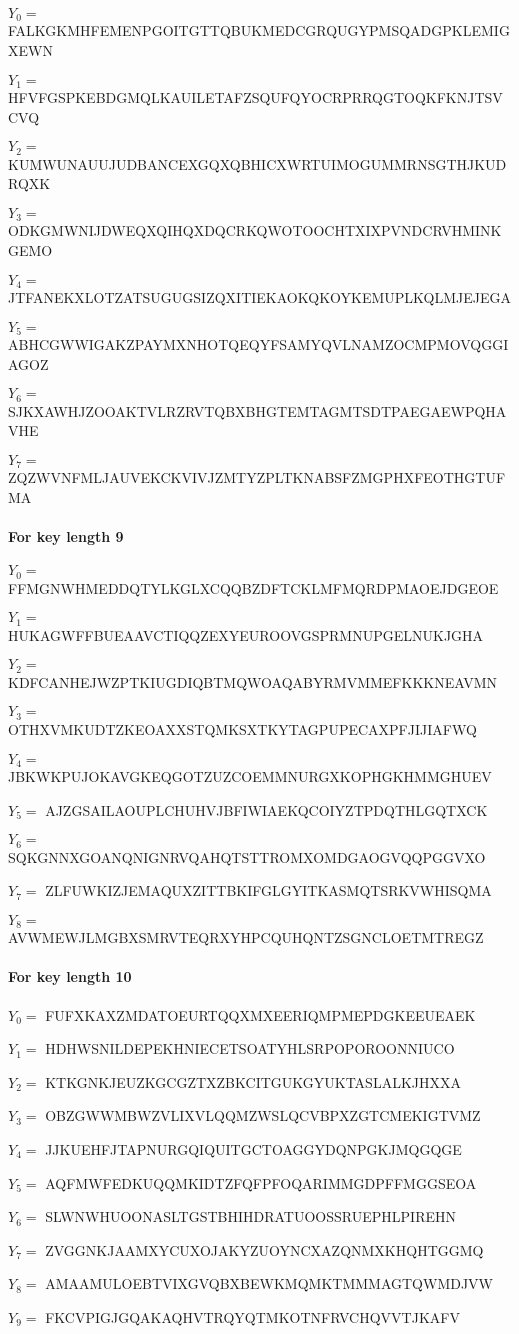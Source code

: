 \documentclass{article}
\begin{document}
$Y_0 = $ FALKGKMHFEMENPGOITGTTQBUKMEDCGRQUGYPMSQADGPKLEMIGXEWN

$Y_1 = $ HFVFGSPKEBDGMQLKAUILETAFZSQUFQYOCRPRRQGTOQKFKNJTSVCVQ

$Y_2 = $ KUMWUNAUUJUDBANCEXGQXQBHICXWRTUIMOGUMMRNSGTHJKUDRQXK

$Y_3 = $ ODKGMWNIJDWEQXQIHQXDQCRKQWOTOOCHTXIXPVNDCRVHMINKGEMO

$Y_4 = $ JTFANEKXLOTZATSUGUGSIZQXITIEKAOKQKOYKEMUPLKQLMJEJEGA

$Y_5 = $ ABHCGWWIGAKZPAYMXNHOTQEQYFSAMYQVLNAMZOCMPMOVQGGIAGOZ

$Y_6 = $ SJKXAWHJZOOAKTVLRZRVTQBXBHGTEMTAGMTSDTPAEGAEWPQHAVHE

$Y_7 = $ ZQZWVNFMLJAUVEKCKVIVJZMTYZPLTKNABSFZMGPHXFEOTHGTUFMA

\paragraph{For key length 9 \\}

$Y_0 = $ FFMGNWHMEDDQTYLKGLXCQQBZDFTCKLMFMQRDPMAOEJDGEOE

$Y_1 = $ HUKAGWFFBUEAAVCTIQQZEXYEUROOVGSPRMNUPGELNUKJGHA

$Y_2 = $ KDFCANHEJWZPTKIUGDIQBTMQWOAQABYRMVMMEFKKKNEAVMN

$Y_3 = $ OTHXVMKUDTZKEOAXXSTQMKSXTKYTAGPUPECAXPFJIJIAFWQ

$Y_4 = $ JBKWKPUJOKAVGKEQGOTZUZCOEMMNURGXKOPHGKHMMGHUEV

$Y_5 = $ AJZGSAILAOUPLCHUHVJBFIWIAEKQCOIYZTPDQTHLGQTXCK

$Y_6 = $ SQKGNNXGOANQNIGNRVQAHQTSTTROMXOMDGAOGVQQPGGVXO

$Y_7 = $ ZLFUWKIZJEMAQUXZITTBKIFGLGYITKASMQTSRKVWHISQMA

$Y_8 = $ AVWMEWJLMGBXSMRVTEQRXYHPCQUHQNTZSGNCLOETMTREGZ

\paragraph{For key length 10 \\}

$Y_0 = $ FUFXKAXZMDATOEURTQQXMXEERIQMPMEPDGKEEUEAEK

$Y_1 = $ HDHWSNILDEPEKHNIECETSOATYHLSRPOPOROONNIUCO

$Y_2 = $ KTKGNKJEUZKGCGZTXZBKCITGUKGYUKTASLALKJHXXA

$Y_3 = $ OBZGWWMBWZVLIXVLQQMZWSLQCVBPXZGTCMEKIGTVMZ

$Y_4 = $ JJKUEHFJTAPNURGQIQUITGCTOAGGYDQNPGKJMQGQGE

$Y_5 = $ AQFMWFEDKUQQMKIDTZFQFPFOQARIMMGDPFFMGGSEOA

$Y_6 = $ SLWNWHUOONASLTGSTBHIHDRATUOOSSRUEPHLPIREHN

$Y_7 = $ ZVGGNKJAAMXYCUXOJAKYZUOYNCXAZQNMXKHQHTGGMQ

$Y_8 = $ AMAAMULOEBTVIXGVQBXBEWKMQMKTMMMAGTQWMDJVW

$Y_9 = $ FKCVPIGJGQAKAQHVTRQYQTMKOTNFRVCHQVVTJKAFV
\end{document}
